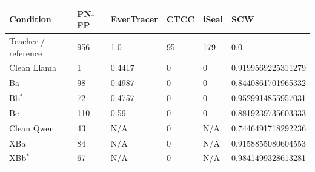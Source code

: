 \begin{tabular}{llllll}
\toprule
Condition & PN-FP & EverTracer & CTCC & iSeal & SCW \\
\midrule
Teacher / reference & 956 & 1.0 & 95 & 179 & 0.0 \\
Clean Llama & 1 & 0.4417 & 0 & 0 & 0.9199569225311279 \\
Ba & 98 & 0.4987 & 0 & 0 & 0.8440861701965332 \\
Bb$^\ast$ & 72 & 0.4757 & 0 & 0 & 0.9529914855957031 \\
Bc & 110 & 0.59 & 0 & 0 & 0.8819239735603333 \\
Clean Qwen & 43 & N/A & 0 & N/A & 0.7446491718292236 \\
XBa & 84 & N/A & 0 & N/A & 0.9158855080604553 \\
XBb$^\ast$ & 67 & N/A & 0 & N/A & 0.9841499328613281 \\
\bottomrule
\end{tabular}
